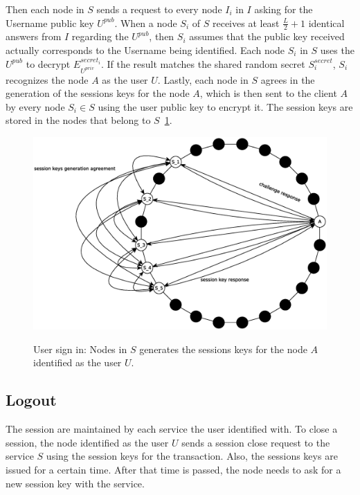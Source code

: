Then each node in $S$ sends a request to every node $I_i$ in $I$ asking for the Username public key $U^{pub}$. When a node
$S_i$ of $S$ receives at least $\frac{L}{2} + 1$ identical answers from
$I$ regarding the $U^{pub}$, then $S_i$ assumes that the public key received
actually corresponds to the Username being identified. Each node $S_i$ in $S$
uses the $U^{pub}$ to decrypt $E^{secret_i}_{U^{priv}}$. If the result matches
the shared random secret $S^{secret}_i$, $S_i$ recognizes the node $A$ as the
user $U$.
Lastly, each node in $S$ agrees in the generation of the sessions keys for the
node $A$, which is then sent to the client $A$ by every node $S_i \in S$ using
the user public key to encrypt it. The session keys are stored in the
nodes that belong to $S$~\ref{fig:sign_in_3}.

\begin{figure}[!htb]
\centering
\includegraphics[width=14cm]{../img/sign_in_3}\\
\caption{User sign in: Nodes in $S$ generates the sessions keys for the node
$A$ identified as the user $U$.}
\label{fig:sign_in_3}
\end{figure}

\subsection{Logout}
The session are maintained by each service the user identified with. To close a
session, the node identified as the user $U$ sends a session close request to
the service $S$ using the session keys for the transaction. Also, the sessions
keys are issued for a certain time. After that time is passed, the node needs
to ask for a new session key with the service.


